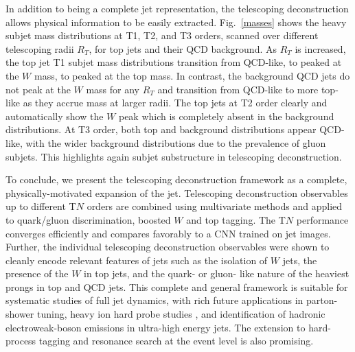 \documentclass[notoc]{JHEP3}
\DeclareRobustCommand{\Fig}[1]{Fig.~\ref{#1}}
\begin{document}
In addition to being a complete jet representation, the telescoping deconstruction allows physical information to be easily extracted. \Fig{masses} shows the heavy subjet mass distributions at T1, T2, and T3 orders, scanned over different telescoping radii $R_T$, for top jets and their QCD background. As $R_T$ is increased, the top jet T1 subjet mass distributions transition from QCD-like, to peaked at the $W$ mass, to peaked at the top mass. In contrast, the background QCD jets do not peak at the $W$ mass for any $R_T$ and transition from QCD-like to more top-like as they %
accrue mass at larger radii. The top jets at T2 order clearly and automatically show the $W$ peak which is completely absent in the background distributions. At T3 order, both top and background distributions appear QCD-like, with the wider background distributions %
due to the prevalence of gluon subjets. This highlights again subjet substructure in telescoping deconstruction.

To conclude, we present the telescoping deconstruction framework as a complete, physically-motivated expansion of the jet.
Telescoping deconstruction observables up to different T$N$ orders are combined using multivariate methods and applied to quark/gluon discrimination, boosted $W$ and top tagging.
The T$N$ performance converges efficiently and compares favorably to a CNN trained on jet images. Further, the individual telescoping deconstruction observables were shown to cleanly encode relevant features of jets such as the isolation of $W$ jets, the presence of the $W$ in top jets, and the quark- or gluon- like nature of the heaviest prongs in top and QCD jets. This complete and general framework is suitable for systematic studies of full jet dynamics, with rich future applications in parton-shower tuning, heavy ion hard probe studies \cite{Chien:2017hij}, and identification of hadronic electroweak-boson emissions in ultra-high energy jets. The extension to hard-process tagging and resonance search at the event level is also promising.





\end{document}
